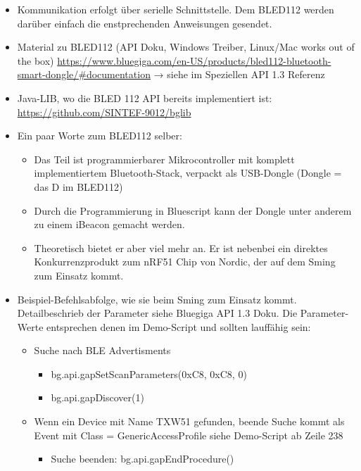 \begin{itemize}
\itemsep 1pt \parskip 0pt \parsep 0pt
\item Kommunikation erfolgt über serielle Schnittstelle. Dem BLED112 werden darüber einfach die enstprechenden Anweisungen gesendet.

\item Material zu BLED112 (API Doku, Windows Treiber, Linux/Mac works out of the box) \url{https://www.bluegiga.com/en-US/products/bled112-bluetooth-smart-dongle/#documentation} → siehe im Speziellen API 1.3 Referenz


\item Java-LIB, wo die BLED 112 API bereits implementiert ist: \url{https://github.com/SINTEF-9012/bglib}


\item Ein paar Worte zum BLED112 selber:
	\begin{itemize}
	\itemsep 1pt \parskip 0pt \parsep 0pt
	\item  Das Teil ist programmierbarer Mikrocontroller mit komplett implementiertem Bluetooth-Stack, verpackt als USB-Dongle (Dongle = das D im BLED112)

	\item  Durch die Programmierung in Bluescript kann der Dongle unter anderem zu einem iBeacon gemacht werden.


	\item  Theoretisch bietet er aber viel mehr an. Er ist nebenbei ein direktes Konkurrenzprodukt zum nRF51 Chip von Nordic, der auf dem Sming zum Einsatz kommt.
	\end{itemize}


\item Beispiel-Befehlsabfolge, wie sie beim Sming zum Einsatz kommt. Detailbeschrieb der Parameter siehe Bluegiga API 1.3 Doku. Die Parameter-Werte entsprechen denen im Demo-Script und sollten lauffähig sein:

	\begin{itemize}
	\itemsep 1pt \parskip 0pt \parsep 0pt
	\item Suche nach BLE Advertisments
		\begin{itemize}
			\itemsep 1pt \parskip 0pt \parsep 0pt
			\item bg.api.gapSetScanParameters(0xC8, 0xC8, 0)
			\item bg.api.gapDiscover(1)
		\end{itemize}

	\item Wenn ein Device mit Name TXW51 gefunden, beende Suche kommt als Event mit Class = GenericAccessProfile siehe Demo-Script ab Zeile 238
		\begin{itemize}
			\itemsep 1pt \parskip 0pt \parsep 0pt
			\item Suche beenden: bg.api.gapEndProcedure()
		\end{itemize}
	


\end{itemize}
\end{itemize}
